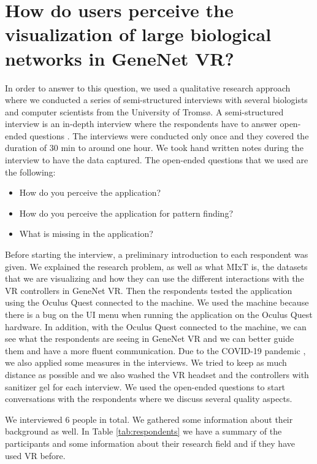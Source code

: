 \section{How do users perceive the visualization of large biological networks in GeneNet VR?}
In order to answer to this question, we used a qualitative research approach where we conducted a series of semi-structured interviews with several biologists and computer scientists from the University of Troms\o. A semi-structured interview is an in-depth interview where the respondents have to answer open-ended questions \cite{interviews}. The interviews were conducted only once and they covered the duration of 30 min to around one hour. We took hand written notes during the interview to have the data captured. The open-ended questions that we used are the following:
\begin{itemize}
  \item How do you perceive the application?
  \item How do you perceive the application for pattern finding?
  \item What is missing in the application?
\end{itemize}

Before starting the interview, a preliminary introduction to each respondent was given. We explained the research problem, as well as what MIxT is, the datasets that we are visualizing and how they can use the different interactions with the VR controllers in GeneNet VR. Then the respondents tested the application using the Oculus Quest connected to the machine. We used the machine because there is a bug on the UI menu when running the application on the Oculus Quest hardware. In addition, with the Oculus Quest connected to the machine, we can see what the respondents are seeing in GeneNet VR and we can better guide them and have a more fluent communication. Due to the COVID-19 pandemic \cite{covid_19}, we also applied some measures in the interviews. We tried to keep as much distance as possible and we also washed the VR headset and the controllers with sanitizer gel for each interview. We used the open-ended questions to start conversations with the respondents where we discuss several quality aspects.

We interviewed 6 people in total. We gathered some information about their background as well. In Table  \ref{tab:respondents} we have a summary of the participants and some information about their research field and if they have used VR before.

